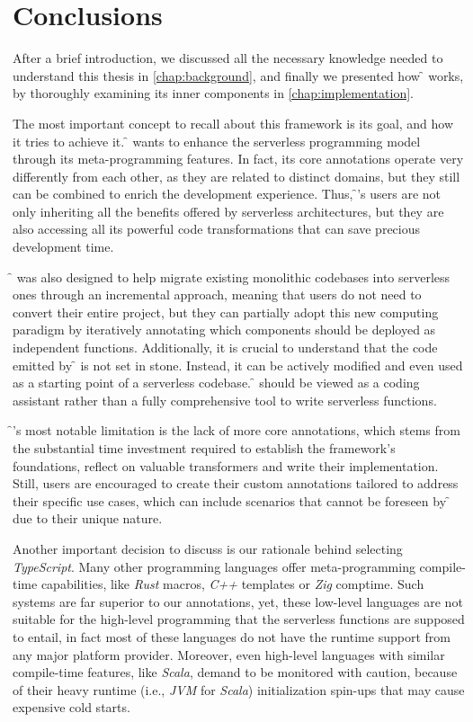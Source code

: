 \chapter{Conclusions}
\label{chap:conclusion}

After a brief introduction, we discussed all the necessary knowledge needed
to understand this thesis in \cref{chap:background}, and finally we presented
how \f{} works, by thoroughly examining its inner components in \cref{chap:implementation}.

The most important concept to recall about this framework is its goal, and how it tries to achieve it.
\f{} wants to enhance the serverless programming model through its meta-programming
features. In fact, its core annotations operate very differently from each other,
as they are related to distinct domains, but they still can be combined
to enrich the development experience.
Thus, \f{}'s users are not only inheriting all the
benefits offered by serverless architectures,
but they are also accessing all its powerful code
transformations that can save precious development time.

\f{} was also designed to help migrate existing
monolithic codebases into serverless ones through an incremental approach,
meaning that users do not need to convert their entire project, but they
can partially adopt this new computing paradigm by iteratively annotating which
components should be deployed as independent functions.
Additionally, it is crucial to understand that the code
emitted by \f{} is not set in stone. Instead, it can be actively modified
and even used as a starting point of a serverless codebase.
\f{} should be viewed as a coding assistant rather than a fully comprehensive tool to write serverless functions.

\f{}'s most notable limitation is the lack of more core annotations,
which stems from the substantial time investment required
to establish the framework's foundations, reflect on valuable transformers and write their implementation.
Still, users are encouraged to create their custom annotations
tailored to address their specific use cases, which can include scenarios
that cannot be foreseen by \f{} due to their unique nature.

Another important decision to discuss is our rationale behind selecting \textit{TypeScript}.
Many other programming languages offer meta-programming compile-time capabilities,
like \textit{Rust} macros, \textit{C++} templates or \textit{Zig} comptime.
Such systems are far superior to our annotations, yet,
these low-level languages are not suitable for the high-level programming
that the serverless functions are supposed to entail, in fact most of these languages
do not have the runtime support from any major platform provider.
Moreover, even high-level languages with similar compile-time features, like \textit{Scala},
demand to be monitored with caution, because of their heavy
runtime (i.e., \textit{JVM} for \textit{Scala}) initialization spin-ups
that may cause expensive cold starts.

